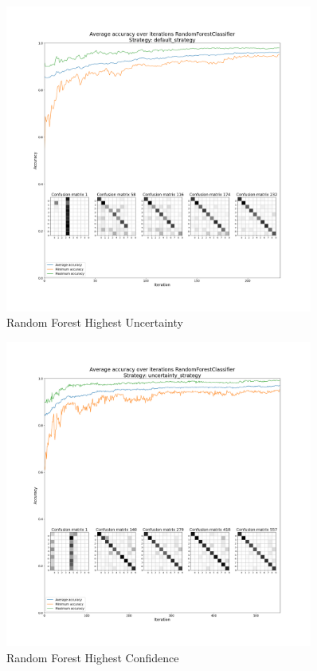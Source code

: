 
\newpage
\onecolumn

\appendix
\begin{figure}[htbp]
\centering
\includegraphics[width=0.9\textwidth]{resources/images/active_learning_RandomForestClassifier_default_strategy_average.png}
\caption{Random Forest Highest Uncertainty}
\end{figure}

\begin{figure}[htbp]
\centering
\includegraphics[width=0.9\textwidth]{resources/images/active_learning_RandomForestClassifier_uncertainty_strategy_average.png}
\caption{Random Forest Highest Confidence}
\end{figure}

